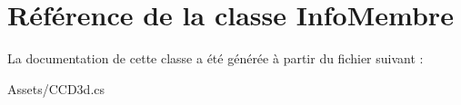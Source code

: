 \section{Référence de la classe Info\+Membre}
\label{class_info_membre}


La documentation de cette classe a été générée à partir du fichier suivant \+:\begin{DoxyCompactItemize}
\item 
Assets/C\+C\+D3d.\+cs\end{DoxyCompactItemize}
